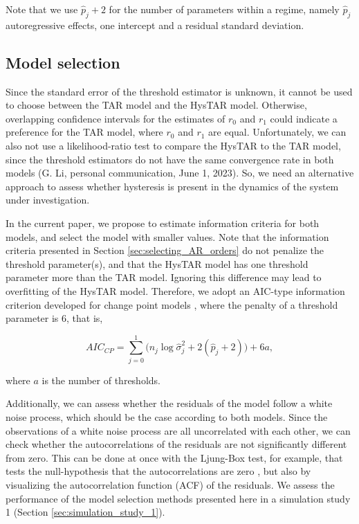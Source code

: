 \documentclass{article}
\begin{document}
Note that we use $\hat{p}_j + 2$ for the number of parameters within a regime, namely $\hat{p}_j$ autoregressive effects, one intercept and a residual standard deviation.

\subsection{Model selection} \label{sec:model_selection}
Since the standard error of the threshold estimator is unknown, it cannot be used to choose between the TAR model and the HysTAR model.
Otherwise, overlapping confidence intervals for the estimates of $r_0$ and $r_1$ could indicate a preference for the TAR model, where $r_0$ and $r_1$ are equal.
Unfortunately, we can also not use a likelihood-ratio test to compare the HysTAR to the TAR model, since the threshold estimators do not have the same convergence rate in both models (G. Li, personal communication, June 1, 2023).
So, we need an alternative approach to assess whether hysteresis is present in the dynamics of the system under investigation.

In the current paper, we propose to estimate information criteria for both models, and select the model with smaller values.
Note that the information criteria presented in Section \ref{sec:selecting_AR_orders} do not penalize the threshold parameter(s), and that the HysTAR model has one threshold parameter more than the TAR model.
Ignoring this difference may lead to overfitting of the HysTAR model.
Therefore, we adopt an AIC-type information criterion developed for change point models \citep[AICcp][]{aiccp}, where the penalty of a threshold parameter is 6, that is,

\begin{equation}
\label{eq:aiccp}
AIC_{CP} = \sum_{j = 0}^{1} \Big(n_j \log \hat{\sigma}_{j}^2 + 2(\hat{p}_j + 2) \Big) + 6a,
\end{equation}

\noindent where $a$ is the number of thresholds.

Additionally, we can assess whether the residuals of the model follow a white noise process, which should be the case according to both models.
Since the observations of a white noise process are all uncorrelated with each other, we can check whether the autocorrelations of the residuals are not significantly different from zero.
This can be done at once with the Ljung-Box test, for example, that tests the null-hypothesis that the autocorrelations are zero \citep{ljungbox}, but also by visualizing the autocorrelation function (ACF) of the residuals.
We assess the performance of the model selection methods presented here in a simulation study 1 (Section \ref{sec:simulation_study_1}).
\end{document}
